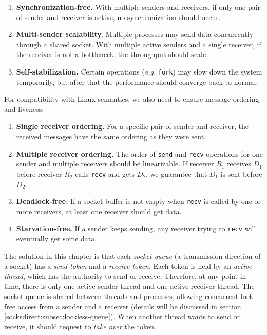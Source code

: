 \begin{enumerate}
 \item \textbf{Synchronization-free.} With multiple senders and receivers, if only one pair of sender and receiver is active, no synchronization should occur.
 \item \textbf{Multi-sender scalability.} Multiple processes may send data concurrently through a shared socket. With multiple active senders and a single receiver, if the receiver is not a bottleneck, the throughput should scale.
 \item \textbf{Self-stabilization.} Certain operations (\textit{e.g.} \texttt{fork}) may slow down the system temporarily, but after that the performance should converge back to normal.
\end{enumerate}

For compatibility with Linux semantics, we also need to ensure message ordering and liveness:
\begin{enumerate}
\item \textbf{Single receiver ordering.} For a specific pair of sender and receiver, the received messages have the same ordering as they were sent.
\item \textbf{Multiple receiver ordering.} The order of \texttt{send} and \texttt{recv} operations for one sender and multiple receivers should be linearizable. If receiver $R_1$ receives $D_1$ before receiver $R_2$ calls \texttt{recv} and gets $D_2$, we guarantee that $D_1$ is sent before $D_2$.
\item \textbf{Deadlock-free.} If a socket buffer is not empty when \texttt{recv} is called by one or more receivers, at least one receiver should get data.
\item \textbf{Starvation-free.} If a sender keeps sending, any receiver trying to \texttt{recv} will eventually get some data.
\end{enumerate}
\fi

The solution in this chapter is that each \emph{socket queue} (a transmission direction of a socket) has a \emph{send token} and a \emph{receive token}. Each token is held by an \emph{active thread}, which has the authority to send or receive. Therefore, at any point in time, there is only one active sender thread and one active receiver thread. The socket queue is shared between threads and processes, allowing concurrent lock-free access from a sender and a receiver (details will be discussed in section \ref{socksdirect:subsec:lockless-queue}). When another thread wants to send or receive, it should request to \emph{take over} the token.

